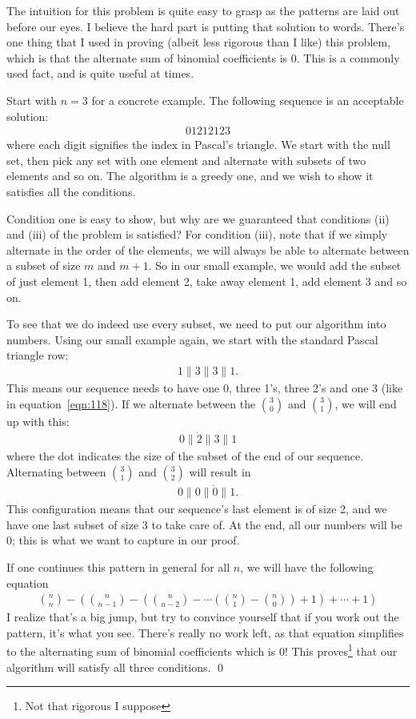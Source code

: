 \documentclass[11pt]{book} %
\begin{document}
\begin{Exercise}
The intuition for this problem is quite easy to grasp as the patterns are laid out before our eyes.
I believe the hard part is putting that solution to words. 
There's one thing that I used in proving (albeit less rigorous than I like) this problem, which is that the 
alternate sum of binomial coefficients is 0. This is a commonly used fact, and is quite useful at times. 

Start with $n=3$ for a concrete example. The following sequence is an acceptable solution: 
\begin{align}
	01212123
	\label{eqn:118}
\end{align}
where each digit signifies the index in Pascal's triangle. We start with the null set, then pick any set with one element 
and alternate with subsets of two elements and so on.
The algorithm is a greedy one, and we wish to show it satisfies all the conditions.

Condition one is easy to show, but why are we guaranteed that conditions (ii) and (iii) of the problem is satisfied?
For condition (iii), note that if we simply alternate in the order of the elements, we will always be able to alternate between
a subset of size $m$ and $m+1$. So in our small example, we would add the subset of just element 1, then add element 2, take 
away element 1, add element 3 and so on.

To see that we do indeed use every subset, we need to put our algorithm into numbers. Using our small example again,
we start with the standard Pascal triangle row: 
\begin{align}
	1\| 3 \| 3 \| 1.
\end{align}
This means our sequence needs to have one 0, three 1's, three 2's and one 3 (like in equation~\ref{eqn:118}).
If we alternate between the ${3 \choose 0}$ and ${3 \choose 1}$, we will end up with this:
\begin{align}
	0\| \dot{2} \| 3 \| 1
\end{align}
where the dot indicates the size of the subset of the end of our sequence. 
Alternating between $3\choose 1$ and $3 \choose 2$ will result in 
\begin{align}
	0\| 0 \| \dot{0} \| 1.
\end{align}
This configuration means that our sequence's last element is of size 2, and we have one last subset of size 3 to take care of.
At the end, all our numbers will be 0; this is what we want to capture in our proof.

If one continues this pattern in general for all $n$, we will have the following equation
\begin{align}
	{n \choose n} - \left( {n\choose n-1} - \left( {n \choose n-2} - \cdots \left( {n \choose 1} - {n \choose 0} \right) +1 \right) + \cdots +1 \right)
\end{align}
I realize that's a big jump, but try to convince yourself that if you work out the pattern, it's what you see. 
There's really no work left, as that equation simplifies to the alternating sum of binomial coefficients which is 0! 
This proves\footnote{Not that rigorous I suppose} that our algorithm will satisfy all three conditions. \qed
\end{Exercise}
\end{document}
